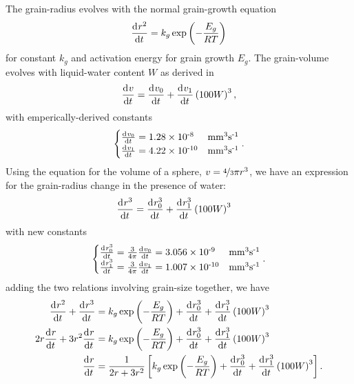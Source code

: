 The grain-radius evolves with the normal grain-growth equation \citep{arthern_2010}
\begin{align}
  \frac{\mathrm{d}^{} r^2}{\mathrm{d} t^{} } = k_g \exp\left(-\frac{E_g}{RT} \right)
\end{align}
for constant $k_g$ and activation energy for grain growth $E_g$.  The grain-volume evolves with liquid-water content $W$ as derived in \citet{brun_1989}
\begin{align*}
  \frac{\mathrm{d}^{} v}{\mathrm{d} t^{} } = \frac{\mathrm{d}^{} v_0}{\mathrm{d} t^{} } + \frac{\mathrm{d}^{} v_1}{\mathrm{d} t^{} } \left(100 W\right)^3,
\end{align*}
with emperically-derived constants
\begin{align*}
  \begin{cases}
    \frac{\mathrm{d}^{} v_0}{\mathrm{d} t^{} } = 1.28 \times 10^{\textrm{-8}}  & \mathrm{mm}^3 \mathrm{s}^{\textrm{-1}} \\
    \frac{\mathrm{d}^{} v_1}{\mathrm{d} t^{} } = 4.22 \times 10^{\textrm{-10}} & \mathrm{mm}^3 \mathrm{s}^{\textrm{-1}} \\
  \end{cases}.
\end{align*}
Using the equation for the volume of a sphere, $v = \nicefrac{4}{3} \pi r^3$, we have an expression for the grain-radius change in the presence of water:
\begin{align}
  \frac{\mathrm{d}^{} r^3}{\mathrm{d} t^{} } &= \frac{\mathrm{d}^{} r_0^3}{\mathrm{d} t^{} } + \frac{\mathrm{d}^{} r_1^3}{\mathrm{d} t^{} } \left(100 W\right)^3
\end{align}
with new constants
\begin{align*}
  \begin{cases}
    \frac{\mathrm{d}^{} r_0^3}{\mathrm{d} t^{} } = \frac{3}{4\pi}\frac{\mathrm{d}^{} v_0}{\mathrm{d} t^{} } = 3.056 \times 10^{\textrm{-9}}  & \mathrm{mm}^3 \mathrm{s}^{\textrm{-1}} \\
    \frac{\mathrm{d}^{} r_1^3}{\mathrm{d} t^{} } = \frac{3}{4\pi}\frac{\mathrm{d}^{} v_1}{\mathrm{d} t^{} } = 1.007 \times 10^{\textrm{-10}} & \mathrm{mm}^3 \mathrm{s}^{\textrm{-1}} \\
  \end{cases}.
\end{align*}
adding the two relations involving grain-size together, we have
\begin{align*}
  \frac{\mathrm{d}^{} r^2}{\mathrm{d} t^{} } + \frac{\mathrm{d}^{} r^3}{\mathrm{d} t^{} } &= k_g \exp\left(-\frac{E_g}{RT} \right) + \frac{\mathrm{d}^{} r_0^3}{\mathrm{d} t^{} } + \frac{\mathrm{d}^{} r_1^3}{\mathrm{d} t^{} } \left(100 W\right)^3 \\
  2r\frac{\mathrm{d}^{} r}{\mathrm{d} t^{} } + 3r^2\frac{\mathrm{d}^{} r}{\mathrm{d} t^{} } &= k_g \exp\left(-\frac{E_g}{RT} \right) + \frac{\mathrm{d}^{} r_0^3}{\mathrm{d} t^{} } + \frac{\mathrm{d}^{} r_1^3}{\mathrm{d} t^{} } \left(100 W\right)^3 \\
  \frac{\mathrm{d}^{} r}{\mathrm{d} t^{} } &= \frac{1}{2r + 3r^2} \left[ k_g \exp\left(-\frac{E_g}{RT} \right) + \frac{\mathrm{d}^{} r_0^3}{\mathrm{d} t^{} } + \frac{\mathrm{d}^{} r_1^3}{\mathrm{d} t^{} } \left(100 W\right)^3 \right].
\end{align*}


